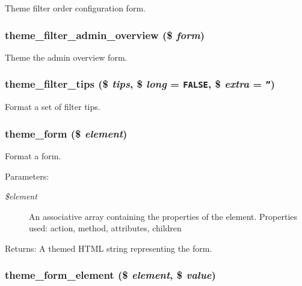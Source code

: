 Theme filter order configuration form. \hypertarget{group__themeable_gb75dc6c3bff3b14c9d8decc0bdf65cf1}{
\subsubsection[{theme\_\-filter\_\-admin\_\-overview}]{\setlength{\rightskip}{0pt plus 5cm}theme\_\-filter\_\-admin\_\-overview (\$ {\em form})}}
\label{group__themeable_gb75dc6c3bff3b14c9d8decc0bdf65cf1}


Theme the admin overview form. \hypertarget{group__themeable_gfaa023779cae01b4864c8bbec37ab6ff}{
\subsubsection[{theme\_\-filter\_\-tips}]{\setlength{\rightskip}{0pt plus 5cm}theme\_\-filter\_\-tips (\$ {\em tips}, \/  \$ {\em long} = {\tt FALSE}, \/  \$ {\em extra} = {\tt ''})}}
\label{group__themeable_gfaa023779cae01b4864c8bbec37ab6ff}


Format a set of filter tips. \hypertarget{group__themeable_g345d44aab3681cd74df8aea85d367f69}{
\subsubsection[{theme\_\-form}]{\setlength{\rightskip}{0pt plus 5cm}theme\_\-form (\$ {\em element})}}
\label{group__themeable_g345d44aab3681cd74df8aea85d367f69}


Format a form.

\begin{Desc}
\item[Parameters:]
\begin{description}
\item[{\em \$element}]An associative array containing the properties of the element. Properties used: action, method, attributes, children \end{description}
\end{Desc}
\begin{Desc}
\item[Returns:]A themed HTML string representing the form. \end{Desc}
\hypertarget{group__themeable_g931b51a2d2c7b43f55a31292850e1078}{
\subsubsection[{theme\_\-form\_\-element}]{\setlength{\rightskip}{0pt plus 5cm}theme\_\-form\_\-element (\$ {\em element}, \/  \$ {\em value})}}
\label{group__themeable_g931b51a2d2c7b43f55a31292850e1078}


